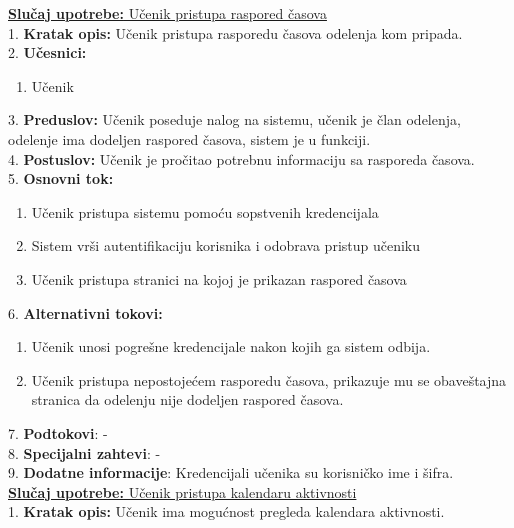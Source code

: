 \documentclass{article}
\begin{document}
\underline{\textbf{Slučaj upotrebe:} Učenik pristupa raspored časova
} \\

1. \textbf{Kratak opis:} Učenik pristupa rasporedu časova odelenja kom pripada. \\

2. \textbf{Učesnici:}
\begin{enumerate} [label=(\alph*)]
\item Učenik
\end{enumerate} 

3. \textbf{Preduslov:} Učenik poseduje nalog na sistemu, učenik je član odelenja, odelenje ima dodeljen raspored časova, sistem je u funkciji. \\

4. \textbf{Postuslov:} Učenik je pročitao potrebnu informaciju sa rasporeda časova. \\

5. \textbf{Osnovni tok:} 
\begin{enumerate} [label=(\alph*)]
\item Učenik pristupa sistemu pomoću sopstvenih kredencijala
\item Sistem vrši autentifikaciju korisnika i odobrava pristup učeniku
\item Učenik pristupa stranici na kojoj je prikazan raspored časova
\end{enumerate}

6. \textbf{Alternativni tokovi:}
\begin{enumerate} [label=(\roman*)]
\item Učenik unosi pogrešne kredencijale nakon kojih ga sistem odbija.
\item Učenik pristupa nepostojećem rasporedu časova, prikazuje mu se obaveštajna stranica da odelenju nije dodeljen raspored časova.

\end{enumerate}

7. \textbf{Podtokovi}: - \\

8. \textbf{Specijalni zahtevi}: - \\

9. \textbf{Dodatne informacije}: Kredencijali učenika su korisničko ime i šifra. \\

\underline{\textbf{Slučaj upotrebe:} Učenik pristupa kalendaru aktivnosti} \\

1. \textbf{Kratak opis:} Učenik ima mogućnost pregleda kalendara aktivnosti.  \\
\end{document}
